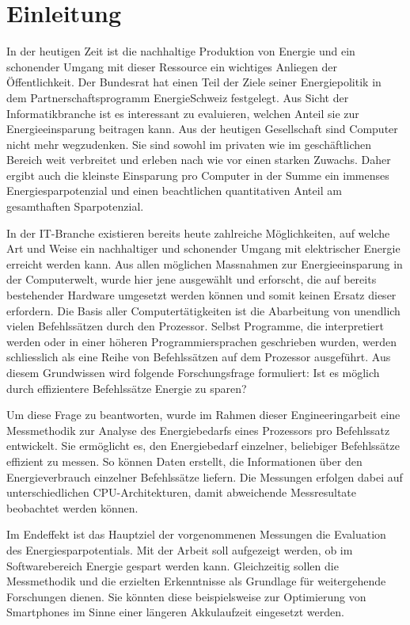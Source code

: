 \chapter{Einleitung}


In der heutigen Zeit ist die nachhaltige Produktion von Energie und ein schonender Umgang mit dieser Ressource ein wichtiges Anliegen der Öffentlichkeit. Der Bundesrat hat einen Teil der Ziele seiner Energiepolitik in dem Partnerschaftsprogramm EnergieSchweiz festgelegt. Aus Sicht der Informatikbranche ist es interessant zu evaluieren, welchen Anteil sie zur Energieeinsparung beitragen kann. Aus der heutigen Gesellschaft sind Computer nicht mehr wegzudenken. Sie sind sowohl im privaten wie im geschäftlichen Bereich weit verbreitet und erleben nach wie vor einen starken Zuwachs. Daher ergibt auch die kleinste Einsparung pro Computer in der Summe ein immenses Energiesparpotenzial und einen beachtlichen quantitativen Anteil am gesamthaften Sparpotenzial. 
\par
In der IT-Branche existieren bereits heute zahlreiche Möglichkeiten, auf welche Art und Weise ein nachhaltiger und schonender Umgang mit elektrischer Energie erreicht werden kann. Aus allen möglichen Massnahmen zur Energieeinsparung in der Computerwelt, wurde hier jene ausgewählt und erforscht, die auf bereits bestehender Hardware umgesetzt werden können und somit keinen Ersatz dieser erfordern. Die Basis aller Computertätigkeiten ist die Abarbeitung von unendlich vielen Befehlssätzen durch den Prozessor. Selbst Programme, die interpretiert werden oder in einer höheren Programmiersprachen geschrieben wurden, werden schliesslich als eine Reihe von Befehlssätzen auf dem Prozessor ausgeführt. Aus diesem Grundwissen wird folgende Forschungsfrage formuliert: Ist es möglich durch effizientere Befehlssätze Energie zu sparen?
\par
Um diese Frage zu beantworten, wurde im Rahmen dieser Engineeringarbeit eine Messmethodik zur Analyse des Energiebedarfs eines Prozessors pro Befehlssatz entwickelt. Sie ermöglicht es, den Energiebedarf einzelner, beliebiger Befehlssätze effizient zu messen. So können Daten erstellt, die Informationen über den Energieverbrauch einzelner Befehlssätze liefern. Die Messungen erfolgen dabei auf unterschiedlichen CPU-Architekturen, damit abweichende Messresultate beobachtet werden können.
\par
Im Endeffekt ist das Hauptziel der vorgenommenen Messungen die Evaluation des Energiesparpotentials. Mit der Arbeit soll aufgezeigt werden, ob im Softwarebereich Energie gespart werden kann. Gleichzeitig sollen die Messmethodik und die erzielten Erkenntnisse als Grundlage für weitergehende Forschungen dienen. Sie könnten diese beispielsweise zur Optimierung von Smartphones im Sinne einer längeren Akkulaufzeit eingesetzt werden.
